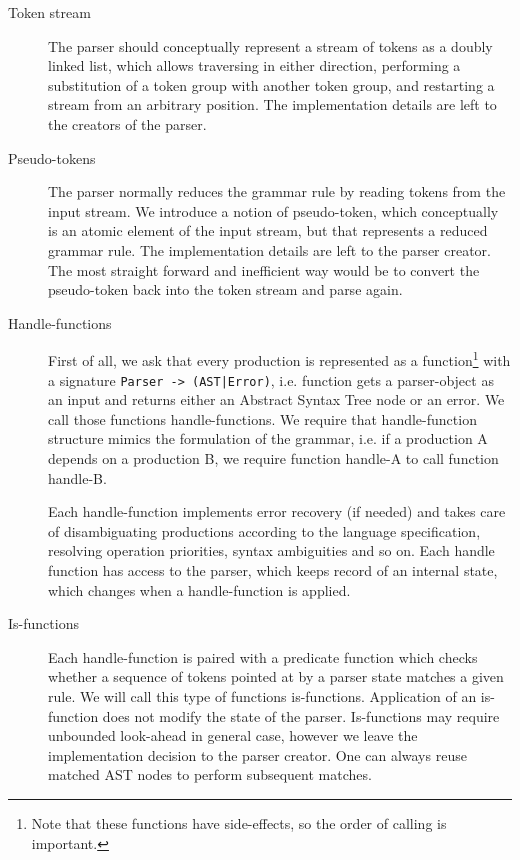 \begin{description}
    \item[Token stream] The parser should conceptually represent
    a stream of tokens as a doubly linked list, which allows
    traversing in either direction, performing a substitution of
    a token group with another token group, and restarting a 
    stream from an arbitrary position.  The implementation details
    are left to the creators of the parser.

    \item[Pseudo-tokens] The parser normally reduces the grammar rule
    by reading tokens from the input stream.  We introduce a notion
    of pseudo-token, which conceptually is an atomic element of the 
    input stream, but that represents a reduced grammar rule.  The 
    implementation details are left to the parser creator.  The most
    straight forward and inefficient way would be to convert the 
    pseudo-token back into the token stream and parse again.
    
    \item[Handle-functions] First of all, we ask that every production
    is represented as a function\footnote{Note that these functions
    have side-effects, so the order of calling is important.} with a
    signature \verb/Parser -> (AST|Error)/, i.e. function gets a
    parser-object as an input and returns either an Abstract Syntax Tree
    node or an error.  We call those functions handle-functions. We
    require that handle-function structure mimics the formulation of the
    grammar, i.e. if a production A depends on a production B, we
    require function handle-A to call function handle-B.

    Each handle-function implements error recovery (if needed) and takes
    care of disambiguating productions according to the language
    specification, resolving operation priorities, syntax ambiguities
    and so on.  Each handle function has access to the parser, which
    keeps record of an internal state, which changes when a 
    handle-function is applied.  
    
    \item[Is-functions] Each handle-function is paired with a predicate
    function which checks whether a sequence of tokens pointed at by a
    parser state matches a given rule.  We will call this type of
    functions is-functions.  Application of an is-function does not modify
    the state of the parser.  Is-functions may require unbounded
    look-ahead in general case, however we leave the implementation
    decision to the parser creator.  One can always reuse matched AST
    nodes to perform subsequent matches.


\end{description}
